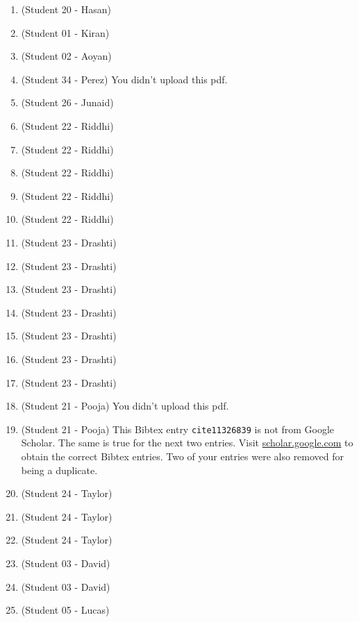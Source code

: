 \begin{enumerate}[label=\#\arabic*]
\item \cite{martin1934problem} (Student 20 - Hasan)
\item \cite{etzion1984construction} (Student 01 - Kiran)
\item \cite{ivanyi2011perfect} (Student 02 - Aoyan)
\item \cite{safaei2024graph} (Student 34 - Perez)
You didn't upload this pdf.
\item \cite{makarov2019construction} (Student 26 - Junaid)
\item \cite{sakata1978general} (Student 22 - Riddhi)
\item \cite{scheinerman2001determining} (Student 22 - Riddhi)
\item \cite{sakata1988finding} (Student 22 - Riddhi)
\item \cite{sakata1981determining} (Student 22 - Riddhi)
\item \cite{pudwell2014debruijn} (Student 22 - Riddhi)
\item \cite{pudwell2014debruijn} (Student 23 - Drashti)
\item \cite{anisiu2006twodimensional} (Student 23 - Drashti)
\item \cite{isaak1996constructions} (Student 23 - Drashti)
\item \cite{gerlach2026shorthand} (Student 23 - Drashti)
\item \cite{tinker2017debruijn} (Student 23 - Drashti)
\item \cite{stojkovic2019pseudorandom} (Student 23 - Drashti)
\item \cite{alma992340821905151} (Student 23 - Drashti)
\item \cite{peng2024generation} (Student 21 - Pooja)
You didn't upload this pdf.
\item \cite{11326839} (Student 21 - Pooja) 
This Bibtex entry \texttt{cite{11326839}} is not from Google Scholar.
The same is true for the next two entries.
Visit \url{scholar.google.com} to obtain the correct Bibtex entries.
Two of your entries were also removed for being a duplicate.
\item \cite{west2005comparison} (Student 24 - Taylor)
\item \cite{roig2024applying} (Student 24 - Taylor)
\item \cite{chee2019binary} (Student 24 - Taylor)
\item \cite{ivanyi1987d} (Student 03 - David)
\item \cite{bossard2022topological} (Student 03 - David)
\item \cite{morita1988reconstruction} (Student 05 - Lucas)

\end{enumerate}

